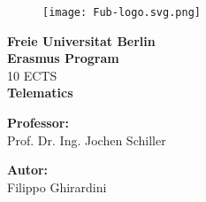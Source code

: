 \begin{titlepage} %
\begin{figure}[t] %
    \centering\texttt{[image: Fub-logo.svg.png]}
\end{figure}
\vspace{20mm}

\begin{Large}
 \begin{center}
	\textbf{Freie Universitat Berlin\\ Erasmus Program\\}
	\vspace{20mm}
    {\LARGE{10 ECTS}}\\
	\vspace{10mm}
	{\huge{\bf Telematics}}\\
\end{center}
\end{Large}


\vspace{36mm}
\begin{minipage}[t]{0.47\textwidth}
	{\large{\bf Professor:}\\ \large{Prof. Dr. Ing. Jochen Schiller}}
\end{minipage}
\hfill
\begin{minipage}[t]{0.47\textwidth}\raggedleft
	{\large{\bf Autor:}\\ \large{Filippo Ghirardini}}
\end{minipage}

\vspace{25mm}

\hrulefill

\vspace{5mm}


\end{titlepage}